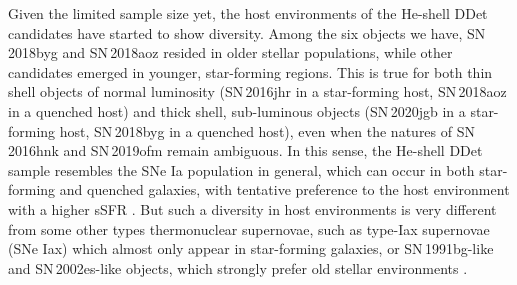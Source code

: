 \documentclass[twocolumn]{aastex631}
\begin{document}
Given the limited sample size yet, the host environments of the He-shell DDet candidates have started to show diversity. Among the six objects we have, SN\,2018byg and SN\,2018aoz resided in older stellar populations, while other candidates emerged in younger, star-forming regions. This is true for both thin shell objects of normal luminosity (SN\,2016jhr in a star-forming host, SN\,2018aoz in a quenched host) and thick shell, sub-luminous objects (SN\,2020jgb in a star-forming host, SN\,2018byg in a quenched host), even when the natures of SN\,2016hnk and SN\,2019ofm remain ambiguous. In this sense, the He-shell DDet sample resembles the SNe Ia population in general, which can occur in both star-forming and quenched galaxies, with tentative preference to the host environment with a higher sSFR \citep[e.g.,][]{Sullivan_2006, Smith_2012}. But such a diversity in host environments is very different from some other types thermonuclear supernovae, such as type-Iax supernovae (SNe Iax) which almost only appear in star-forming galaxies, or SN\,1991bg-like and SN\,2002es-like objects, which strongly prefer old stellar environments \citep[see the review in][]{Jha_2019}. 
\end{document}

